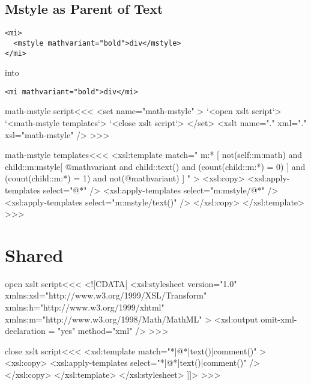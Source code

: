 \documentclass{article}
\begin{document}
\subsection{Mstyle as Parent of Text}


\begin{verbatim}
<mi> 
  <mstyle mathvariant="bold">div</mstyle> 
</mi> 
\end{verbatim}

into

\begin{verbatim}
<mi mathvariant="bold">div</mi>
\end{verbatim}

\<math-mstyle script\><<<
<set name="math-mstyle" >
   `<open xslt script`>
   `<math-mstyle templates`>
   `<close xslt script`>
</set>
<xslt name="." xml="." xsl="math-mstyle" />
>>>


\<math-mstyle templates\><<<
<xsl:template match=" m:* [  
      not(self::m:math)
    and
      child::m:mstyle[ 
           @mathvariant
         and
           child::text()
         and
           (count(child::m:*) = 0)    
      ] 
    and
      (count(child::m:*) = 1)    
    and
      not(@mathvariant) 
] " > 
  <xsl:copy>
     <xsl:apply-templates select="@*" /> 
     <xsl:apply-templates select="m:mstyle/@*" /> 
     <xsl:apply-templates select="m:mstyle/text()" /> 
  </xsl:copy>
</xsl:template> 
>>>


\section{Shared}



\<open xslt script\><<<
<![CDATA[ 
   <xsl:stylesheet version="1.0"
      xmlns:xsl="http://www.w3.org/1999/XSL/Transform"
      xmlns:h="http://www.w3.org/1999/xhtml"
      xmlns:m="http://www.w3.org/1998/Math/MathML"
   >
      <xsl:output omit-xml-declaration = "yes" method="xml" />
>>>

\<close xslt script\><<<
      <xsl:template match="*|@*|text()|comment()" >
        <xsl:copy>
          <xsl:apply-templates select="*|@*|text()|comment()" />
        </xsl:copy>
      </xsl:template>
   </xsl:stylesheet> 
]]>
>>>







\end{document}
